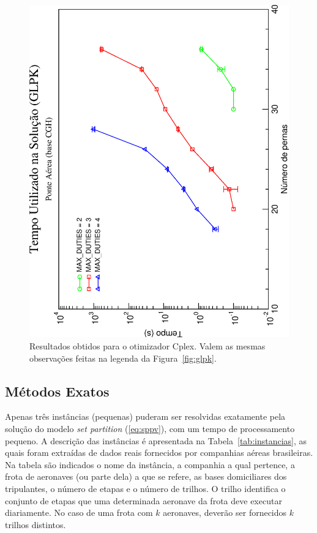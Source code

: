 \documentclass[12pt,a4paper]{article}
\begin{document}
\begin{figure}[htb]
	\begin{center}
		\includegraphics[scale=0.45,angle=-90]{fig/glpk_solution_time.eps}
		\caption{Resultados obtidos para o otimizador Cplex. Valem as mesmas observações feitas na 
		legenda da Figura~\ref{fig:glpk}.}
		\label{fig:cplex}
	\end{center}
\end{figure}


\subsection{Métodos Exatos}
\label{sec:resultados_exatos}

Apenas três instâncias (pequenas) puderam ser resolvidas exatamente pela solução do modelo {\it set
partition} (\ref{eq:sppv}), com um tempo de processamento pequeno. A descrição das instâncias é
apresentada na Tabela~\ref{tab:instancias}, as quais foram extraídas de dados reais fornecidos por
companhias aéreas brasileiras. Na tabela são indicados o nome da instância, a companhia a qual
pertence, a frota de aeronaves (ou parte dela) a que se refere, as bases domiciliares dos
tripulantes, o número de etapas e o número de trilhos. O trilho identifica o conjunto de etapas que
uma determinada aeronave da frota deve executar diariamente. No caso de uma frota com $k$ aeronaves,
deverão ser fornecidos $k$ trilhos distintos.
\end{document}
